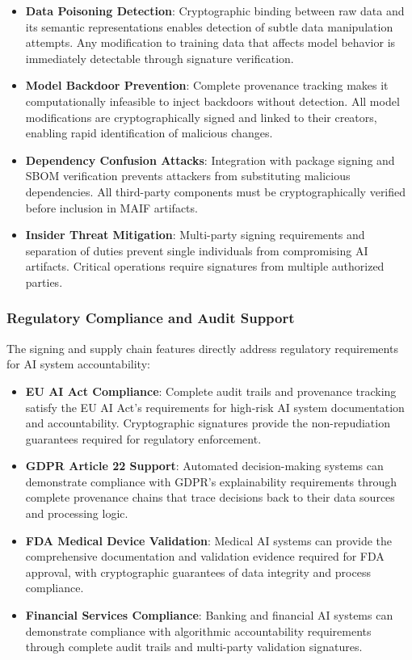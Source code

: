 \documentclass[conference]{IEEEtran}
\begin{document}
\begin{itemize}[leftmargin=*]
\item \textbf{Data Poisoning Detection}: Cryptographic binding between raw data and its semantic representations enables detection of subtle data manipulation attempts. Any modification to training data that affects model behavior is immediately detectable through signature verification.

\item \textbf{Model Backdoor Prevention}: Complete provenance tracking makes it computationally infeasible to inject backdoors without detection. All model modifications are cryptographically signed and linked to their creators, enabling rapid identification of malicious changes.

\item \textbf{Dependency Confusion Attacks}: Integration with package signing and SBOM verification prevents attackers from substituting malicious dependencies. All third-party components must be cryptographically verified before inclusion in MAIF artifacts.

\item \textbf{Insider Threat Mitigation}: Multi-party signing requirements and separation of duties prevent single individuals from compromising AI artifacts. Critical operations require signatures from multiple authorized parties.
\end{itemize}

\subsubsection{Regulatory Compliance and Audit Support}

The signing and supply chain features directly address regulatory requirements for AI system accountability:

\begin{itemize}[leftmargin=*]
\item \textbf{EU AI Act Compliance}: Complete audit trails and provenance tracking satisfy the EU AI Act's requirements for high-risk AI system documentation and accountability. Cryptographic signatures provide the non-repudiation guarantees required for regulatory enforcement.

\item \textbf{GDPR Article 22 Support}: Automated decision-making systems can demonstrate compliance with GDPR's explainability requirements through complete provenance chains that trace decisions back to their data sources and processing logic.

\item \textbf{FDA Medical Device Validation}: Medical AI systems can provide the comprehensive documentation and validation evidence required for FDA approval, with cryptographic guarantees of data integrity and process compliance.

\item \textbf{Financial Services Compliance}: Banking and financial AI systems can demonstrate compliance with algorithmic accountability requirements through complete audit trails and multi-party validation signatures.
\end{itemize}
\end{document}
